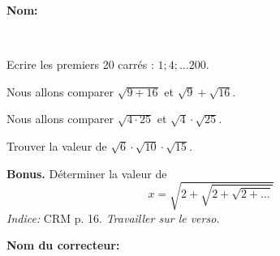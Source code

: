 \documentclass[12pt]{exam}
\begin{document}
\textbf{Nom:} \dotfill

\
\begin{questions}


\question[2] Ecrire les premiers 20 carrés : $1; 4; \ldots 200.$

\fillwithdottedlines{14mm}

\question[3] Nous allons comparer $\sqrt{9+16}$ et $\sqrt{9} + \sqrt{16}$.


\question[3] Nous allons comparer $\sqrt{4 \cdot 25}$ et $\sqrt{4} \cdot \sqrt{25}$.


\question[1] Trouver la valeur de $\sqrt{6} \cdot \sqrt{10} \cdot \sqrt{15}$.
\fillwithdottedlines{14mm}

\vfill

\question \textbf{Bonus.} Déterminer la valeur de $$ x = \sqrt{2+\sqrt {2+\sqrt { 2+\ldots}}}$$
\emph{Indice:} CRM p. 16. \hfill \emph{Travailler sur le verso.}


\end{questions}

\begin{tcolorbox}

\textbf{Nom du correcteur:}

\begin{center}
\gradetable[h][questions]
\end{center}

\end{tcolorbox}
\end{document}
